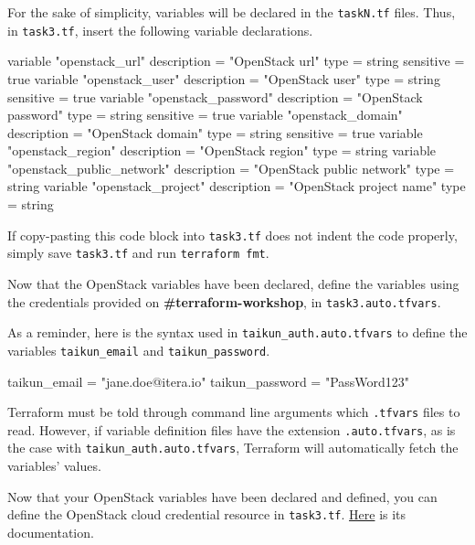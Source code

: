 For the sake of simplicity, variables will be declared in the \texttt{taskN.tf} files.
Thus, in \texttt{task3.tf}, insert the following variable declarations.
\begin{tf}
variable "openstack_url" {
  description = "OpenStack url"
  type        = string
  sensitive   = true
}
variable "openstack_user" {
  description = "OpenStack user"
  type        = string
  sensitive   = true
}
variable "openstack_password" {
  description = "OpenStack password"
  type        = string
  sensitive   = true
}
variable "openstack_domain" {
  description = "OpenStack domain"
  type        = string
  sensitive   = true
}
variable "openstack_region" {
  description = "OpenStack region"
  type        = string
}
variable "openstack_public_network" {
  description = "OpenStack public network"
  type        = string
}
variable "openstack_project" {
  description = "OpenStack project name"
  type        = string
}
\end{tf}
\begin{note}
  If copy-pasting this code block into \texttt{task3.tf} does not indent the code properly,
  simply save \texttt{task3.tf} and run \texttt{terraform fmt}.
\end{note}

Now that the OpenStack variables have been declared,
define the variables using the credentials provided on \textbf{\#terraform-workshop}, in \texttt{task3.auto.tfvars}.

\begin{tip}
As a reminder, here is the syntax used in \texttt{taikun\_auth.auto.tfvars} to define the variables \texttt{taikun\_email}
and \texttt{taikun\_password}.
\begin{tf}
taikun_email = "jane.doe@itera.io"
taikun_password = "PassWord123"
\end{tf}
\end{tip}

\begin{tip}
  Terraform must be told through command line arguments which \texttt{.tfvars} files to read.
  However, if variable definition files have the extension \texttt{.auto.tfvars}, as is the case with
  \texttt{taikun\_auth.auto.tfvars}, Terraform will automatically fetch the variables' values.
\end{tip}

Now that your OpenStack variables have been declared and defined, you can define the OpenStack cloud credential resource in \texttt{task3.tf}.
\href{https://intuinewin.github.io/taikun-docs/resources/cloud_credential_openstack.html}{Here} is its documentation.

